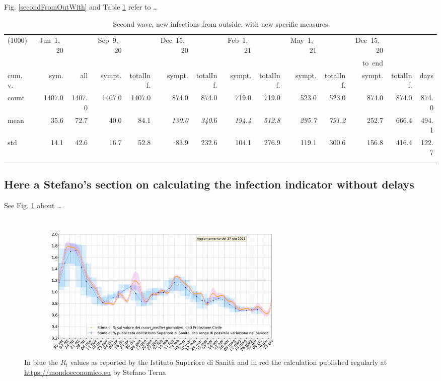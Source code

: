 \documentclass[graybox]{svmult}
\begin{document}
Fig. \ref{secondFromOutWith} and Table \ref{selSpontWave2Contr2Tab} refer to \ldots

\begin{table}[t]
\center
\tiny
\begin{tabular}{lrrrrrrrrrrrrr}
\hline\noalign{\smallskip}
(1000) & Jun~1,~20 & & Sep~9,~20 & & Dec~15,~20 & & Feb~1,~21 & & May~1,~21 & & Dec~15,~20 \\
& & & & & & & & & & & to~end \\
cum.~v. & sym. & all & sympt. & totalInf. & sympt. & totalInf. & sympt. & totalInf. & sympt. & totalInf. & sympt. & totalInf. & days\\
\noalign{\smallskip}\svhline\noalign{\smallskip}
count & 1407.0 & 1407.0 & 1407.0 & 1407.0 & 874.0 & 874.0 & 719.0 & 719.0 & 523.0 & 523.0 & 874.0 & 874.0 & 874.0 \\
mean & 35.6 & 72.7 & 40.0 & 84.1 & \emph{130.0} & \emph{340}.6 & \emph{194.4} & \emph{512.8} & \emph{295.7} & \emph{791.2} & 252.7 & 666.4 & 494.1 \\
std & 14.1 & 42.6 & 16.7 & 52.8 & 83.9 & 232.6 & 104.1 & 276.9 & 119.1 & 300.6 & 156.8 & 416.4 & 122.7 \\
\hline\noalign{\smallskip}
\end{tabular}
\caption{Second wave, new infections from outside, with new specific measures}
\label{selSpontWave2Contr2Tab}
\end{table}



\subsection{Here a Stefano's section on calculating the infection indicator without delays}
\label{indicator}

See Fig. \ref{Rt} about \ldots

\begin{figure}[t]
\center
\includegraphics[width=0.7\textwidth]{RtEstimation.jpg}
\caption{In blue the $R_t$ values as reported by the Istituto Superiore di Sanit\`{a} and in red the calculation published regularly at \href{https://mondoeconomico.eu}{https://mondoeconomico.eu} by Stefano Terna}
\label{Rt}
\end{figure}
\end{document}
